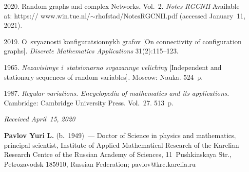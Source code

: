 \begin{multicols}{2}
{{\begin{thebibliography}{99}
 2020. Random graphs and complex Networks. Vol.~2. 
\textit{Notes RGCNII} Available at: 
{\sf https:// www.win.tue.nl/$\sim$rhofstad/NotesRGCNII.pdf} (accessed January~11, 2021).

 2019. O~svyaznosti konfiguratsionnykh grafov 
[On connectivity of configuration graphs]. \textit{Discrete Mathematics Applications} 31(2):115--123.

 1965.  
\textit{Nezavisimye i~statsionarno svyazannye velichiny} 
[Independent and stationary sequences of random variables]. Moscow: Nauka. 524~p.

 1987. \textit{Regular variations. Encyclopedia of mathematics and its applications.} 
 Cambridge: Cambridge University Press.  Vol.~27. 513~p.



\end{thebibliography}

 }
 }

\end{multicols}

\vspace*{-3pt}

  \hfill{\small\textit{Received April~15, 2020}}





\Contrl

\noindent
\textbf{Pavlov Yuri L.} (b.\ 1949)~--- 
Doctor of Science in physics and mathematics, principal scientist, Institute 
of Applied Mathematical Research of the Karelian Research Centre 
of the Russian Academy of Sciences, 11~Pushkinskaya Str., Petrozavodsk 185910, Russian Federation; 
\mbox{pavlov@krc.karelia.ru}


\label{end\stat}

\renewcommand{\bibname}{\protect\rm Литература} 
     